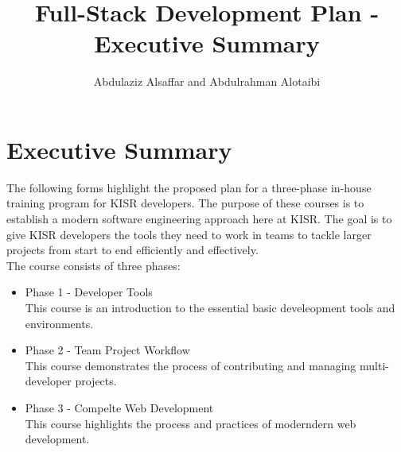 \documentclass[a4paper,11pt]{article}
\author{Abdulaziz Alsa{f}far and Abdulrahman Alotaibi}
\title{Full-Stack Development Plan - Executive Summary}
\begin{document}
\maketitle
\pagestyle{plain}
\setcounter{page}{1}

\section{Executive Summary}

The following forms highlight the proposed plan for a three-phase in-house training program for KISR developers. The purpose of these courses is to establish a modern software engineering approach here at KISR. The goal is to give KISR developers the tools they need to work in teams to tackle larger projects from start to end efficiently and effectively.\\

The course consists of three phases:
\begin{itemize}
	\item Phase 1 - Developer Tools\\This course is an introduction to the essential basic develeopment tools and environments.
	\item Phase 2 - Team Project Workflow\\This course demonstrates the process of contributing and managing multi-developer projects.
	\item Phase 3 - Compelte Web Development\\This course highlights the process and practices of moderndern web development.
\end{itemize}
\end{document}
